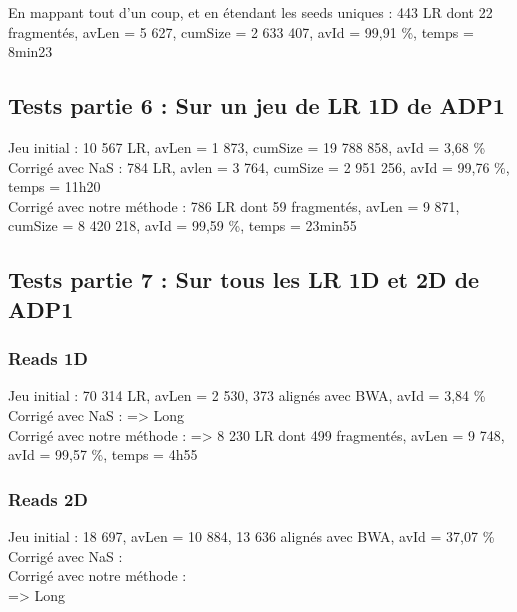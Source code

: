 \documentclass[12pt]{article}
\begin{document}
En mappant tout d'un coup, et en étendant les seeds uniques : 443 LR dont 22 fragmentés, avLen = 5 627, cumSize = 2 633 407, avId = 99,91 \%, temps = 8min23

\subsection{Tests partie 6 : Sur un jeu de LR 1D de ADP1}

Jeu initial :  10 567 LR, avLen =  1 873, cumSize = 19 788 858, avId =  3,68 \% \\

Corrigé avec NaS : 784 LR, avlen = 3 764, cumSize = 2 951 256, avId = 99,76 \%, temps = 11h20 \\

Corrigé avec notre méthode : 786 LR dont 59 fragmentés, avLen = 9 871, cumSize = 8 420 218, avId = 99,59 \%, temps = 23min55 \\

\subsection{Tests partie 7 : Sur tous les LR 1D et 2D de ADP1}

\subsubsection{Reads 1D}

Jeu initial : 70 314 LR, avLen = 2 530, 373 alignés avec BWA, avId = 3,84 \% \\

Corrigé avec NaS : => Long \\

Corrigé avec notre méthode : => 8 230 LR dont 499 fragmentés, avLen = 9 748, avId = 99,57 \%, temps = 4h55 \\

\subsubsection{Reads 2D}

Jeu initial : 18 697, avLen = 10 884, 13 636 alignés avec BWA, avId = 37,07 \% \\

Corrigé avec NaS : \\

Corrigé avec notre méthode : \\

=> Long
\end{document}
